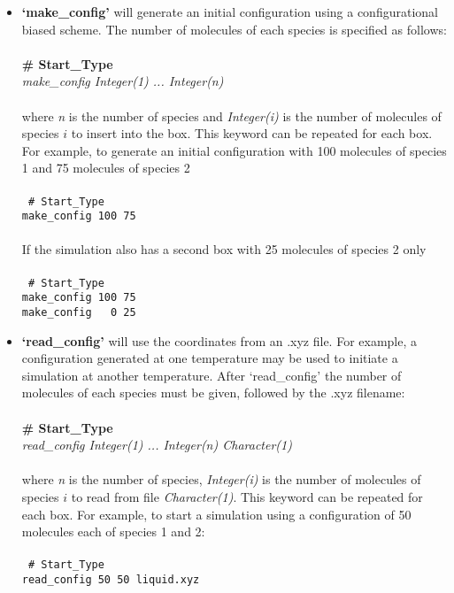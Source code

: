 \begin{itemize} 
\item \textbf{`make\_config'} will generate an initial configuration using a configurational biased scheme. 
The number of molecules of each species is specified as follows: \\ \\
%
{\bf \# Start\_Type} \\
{\it make\_config Integer(1) ... Integer(n)} \\ \\
%
where {\it n} is the number of species and {\it Integer(i)} is the number of molecules of species $i$ to insert into the box. 
This keyword can be repeated for each box. 
For example, to generate an initial configuration with 100 molecules of species 1 and 75 molecules of species 2 \\ \\
%
 \texttt{
 \# Start\_Type \\
 make\_config 100 75 \\} \\
%
If the simulation also has a second box with 25 molecules of species 2 only \\ \\
%
 \texttt{
 \# Start\_Type \\
 make\_config 100 75\\
 make\_config \ \ 0 25\\}
%
\item {\textbf{`read\_config'}} will use the coordinates from an .xyz file.
For example, a configuration generated at one temperature may be used to initiate a simulation at another temperature. 
After `read\_config' the number of molecules of each species must be given, followed by the .xyz filename: \\ \\
%
{\bf \# Start\_Type} \\
{\it read\_config Integer(1) ... Integer(n) Character(1)}\\ \\
%
where {\it n} is the number of species, {\it Integer(i)} is the number of molecules of species $i$ to read from file 
{\it Character(1)}.
This keyword can be repeated for each box. 
For example, to start a simulation using a configuration of 50 molecules each of species 1 and 2: \\ \\
%
\texttt{
\# Start\_Type \\
read\_config 50 50 liquid.xyz \\} \\

\end{itemize}
